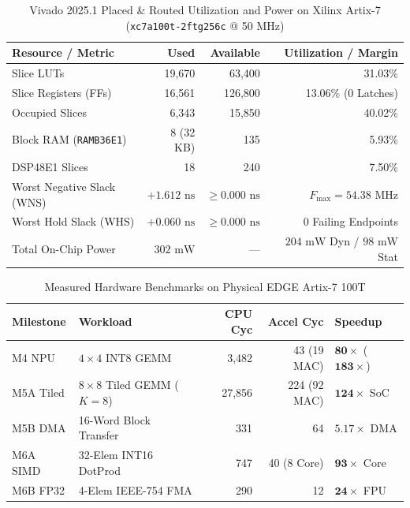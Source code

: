 \documentclass[conference]{IEEEtran}
\begin{document}
\begin{table}[htbp]
\caption{Vivado 2025.1 Placed \& Routed Utilization and Power on Xilinx Artix-7 (\texttt{xc7a100t-2ftg256c} @ 50 MHz)}
\begin{center}
\begin{tabular}{lrrr}
\toprule
\textbf{Resource / Metric} & \textbf{Used} & \textbf{Available} & \textbf{Utilization / Margin} \\
\midrule
Slice LUTs & 19,670 & 63,400 & 31.03\% \\
Slice Registers (FFs) & 16,561 & 126,800 & 13.06\% (0 Latches) \\
Occupied Slices & 6,343 & 15,850 & 40.02\% \\
Block RAM (\texttt{RAMB36E1}) & 8 (32 KB) & 135 & 5.93\% \\
DSP48E1 Slices & 18 & 240 & 7.50\% \\
Worst Negative Slack (WNS) & $+1.612\text{ ns}$ & $\ge 0.000\text{ ns}$ & $F_{\max} = 54.38\text{ MHz}$ \\
Worst Hold Slack (WHS) & $+0.060\text{ ns}$ & $\ge 0.000\text{ ns}$ & 0 Failing Endpoints \\
Total On-Chip Power & $302\text{ mW}$ & — & $204\text{ mW}$ Dyn / $98\text{ mW}$ Stat \\
\bottomrule
\end{tabular}
\end{center}
\end{table}

\begin{table}[htbp]
\caption{Measured Hardware Benchmarks on Physical EDGE Artix-7 100T}
\begin{center}
\begin{tabular}{llrrl}
\toprule
\textbf{Milestone} & \textbf{Workload} & \textbf{CPU Cyc} & \textbf{Accel Cyc} & \textbf{Speedup} \\
\midrule
M4 NPU & $4 \times 4$ INT8 GEMM & 3,482 & 43 (19 MAC) & $\mathbf{80\times}$ ($\mathbf{183\times}$) \\
M5A Tiled & $8 \times 8$ Tiled GEMM ($K=8$) & 27,856 & 224 (92 MAC) & $\mathbf{124\times}$ SoC \\
M5B DMA & 16-Word Block Transfer & 331 & 64 & $\mathbf{5.17\times}$ DMA \\
M6A SIMD & 32-Elem INT16 DotProd & 747 & 40 (8 Core) & $\mathbf{93\times}$ Core \\
M6B FP32 & 4-Elem IEEE-754 FMA & 290 & 12 & $\mathbf{24\times}$ FPU \\
\bottomrule
\end{tabular}
\end{center}
\end{table}
\end{document}
